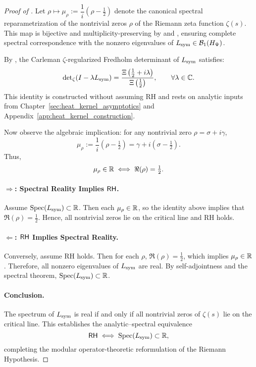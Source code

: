 \begin{proof}[Proof of ]
Let \( \rho \mapsto \mu_\rho := \dfrac{1}{i}(\rho - \tfrac{1}{2}) \) denote the canonical spectral reparametrization of the nontrivial zeros \( \rho \) of the Riemann zeta function \( \zeta(s) \). This map is bijective and multiplicity-preserving by  and , ensuring complete spectral correspondence with the nonzero eigenvalues of \( L_{\mathrm{sym}} \in \mathcal{B}_1(H_{\Psi}) \).

\medskip

By , the Carleman \(\zeta\)-regularized Fredholm determinant of \( L_{\mathrm{sym}} \) satisfies:
\[
\det\nolimits_{\zeta}(I - \lambda L_{\mathrm{sym}}) = \frac{\Xi\left( \tfrac{1}{2} + i\lambda \right)}{\Xi\left( \tfrac{1}{2} \right)},
\qquad \forall \lambda \in \mathbb{C}.
\]
This identity is constructed without assuming RH and rests on analytic inputs from Chapter~\ref{sec:heat_kernel_asymptotics} and Appendix~\ref{app:heat_kernel_construction}.

\medskip

Now observe the algebraic implication: for any nontrivial zero \( \rho = \sigma + i\gamma \),
\[
\mu_\rho := \frac{1}{i}(\rho - \tfrac{1}{2}) = \gamma + i(\sigma - \tfrac{1}{2}).
\]
Thus,
\[
\mu_\rho \in \mathbb{R} \iff \Re(\rho) = \tfrac{1}{2}.
\]

\paragraph*{\( \Rightarrow \): Spectral Reality Implies \(\mathsf{RH}\).}
Assume \( \operatorname{Spec}(L_{\mathrm{sym}}) \subset \mathbb{R} \). Then each \( \mu_\rho \in \mathbb{R} \), so the identity above implies that \( \Re(\rho) = \tfrac{1}{2} \). Hence, all nontrivial zeros lie on the critical line and RH holds.

\paragraph*{\( \Leftarrow \): \(\mathsf{RH}\) Implies Spectral Reality.}
Conversely, assume RH holds. Then for each \( \rho \), \( \Re(\rho) = \tfrac{1}{2} \), which implies \( \mu_\rho \in \mathbb{R} \). Therefore, all nonzero eigenvalues of \( L_{\mathrm{sym}} \) are real. By self-adjointness and the spectral theorem, \( \operatorname{Spec}(L_{\mathrm{sym}}) \subset \mathbb{R} \).

\paragraph*{Conclusion.}
The spectrum of \( L_{\mathrm{sym}} \) is real if and only if all nontrivial zeros of \( \zeta(s) \) lie on the critical line. This establishes the analytic–spectral equivalence
\[
\mathsf{RH} \iff \operatorname{Spec}(L_{\mathrm{sym}}) \subset \mathbb{R},
\]
completing the modular operator-theoretic reformulation of the Riemann Hypothesis.
\end{proof}
